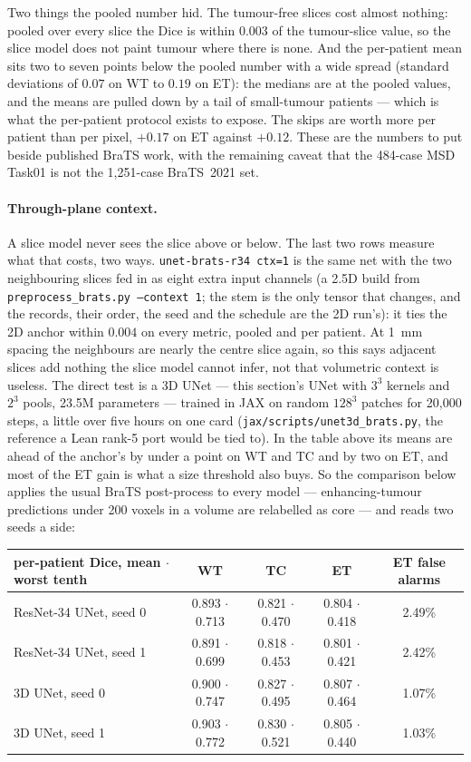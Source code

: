 \noindent Two things the pooled number hid. The tumour-free slices cost almost
nothing: pooled over every slice the Dice is within $0.003$ of the tumour-slice
value, so the slice model does not paint tumour where there is none. And the
per-patient mean sits two to seven points below the pooled number with a wide
spread (standard deviations of $0.07$ on WT to $0.19$ on ET): the medians are
at the pooled values, and the means are pulled down by a tail of small-tumour
patients --- which is what the per-patient protocol exists to expose. The skips
are worth more per patient than per pixel, $+0.17$ on ET against $+0.12$. These
are the numbers to put beside published BraTS work, with the remaining caveat
that the 484-case MSD Task01 is not the 1{,}251-case BraTS~2021 set.

\paragraph{Through-plane context.} A slice model never sees the slice above or
below. The last two rows measure what that costs, two ways. \texttt{unet-brats-r34
ctx=1} is the same net with the two neighbouring slices fed in as eight extra
input channels (a 2.5D build from \texttt{preprocess\_brats.py --context 1};
the stem is the only tensor that changes, and the records, their order, the seed
and the schedule are the 2D run's): it ties the 2D anchor within $0.004$ on every
metric, pooled and per patient. At 1~mm spacing the neighbours are nearly the
centre slice again, so this says adjacent slices add nothing the slice model
cannot infer, not that volumetric context is useless. The direct test is a 3D
UNet --- this section's UNet with $3^3$ kernels and $2^3$ pools, 23.5M
parameters --- trained in JAX on random $128^3$ patches for 20{,}000 steps,
a little over five hours on one card (\texttt{jax/scripts/unet3d\_brats.py},
the reference a Lean rank-5 port would be tied to). In the table above its
means are ahead of the anchor's by under a point on WT and TC and by two on
ET, and most of the ET gain is what a size threshold also buys. So the
comparison below applies the usual BraTS post-process to every model ---
enhancing-tumour predictions under 200 voxels in a volume are relabelled as
core --- and reads two seeds a side:

\begin{center}
\begin{tabular}{lcccc}
\hline
per-patient Dice, mean $\cdot$ worst tenth & WT & TC & ET & ET false alarms \\
\hline
ResNet-34 UNet, seed 0 & 0.893 $\cdot$ 0.713 & 0.821 $\cdot$ 0.470 & 0.804 $\cdot$ 0.418 & 2.49\% \\
ResNet-34 UNet, seed 1 & 0.891 $\cdot$ 0.699 & 0.818 $\cdot$ 0.453 & 0.801 $\cdot$ 0.421 & 2.42\% \\
3D UNet, seed 0        & 0.900 $\cdot$ 0.747 & 0.827 $\cdot$ 0.495 & 0.807 $\cdot$ 0.464 & 1.07\% \\
3D UNet, seed 1        & 0.903 $\cdot$ 0.772 & 0.830 $\cdot$ 0.521 & 0.805 $\cdot$ 0.440 & 1.03\% \\
\hline
\end{tabular}
\end{center}

